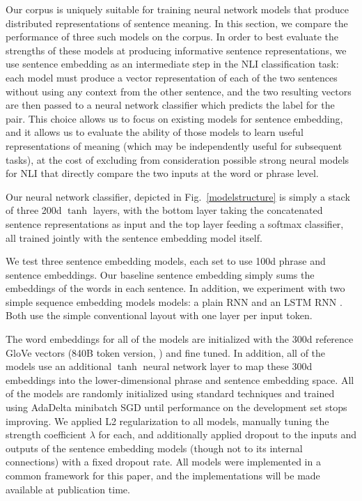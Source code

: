 Our corpus is uniquely suitable for training neural network models that produce distributed representations of sentence meaning. In this section, we compare the performance of three such models on the corpus. 
In order to best evaluate the strengths of these models at producing informative sentence representations, we use sentence embedding as an intermediate step in the NLI classification task: each model must produce a vector representation of each of the two sentences without using any context from the other sentence, and the two resulting vectors are then passed to a neural network classifier which predicts the label for the pair. This choice allows us to focus on existing models for sentence embedding, and it allows us to evaluate the ability of those models to learn useful representations of meaning (which may be independently useful for subsequent tasks), at the cost of excluding from consideration possible strong neural models for NLI that directly compare the two inputs at the word or phrase level.



Our neural network classifier, depicted in Fig.~\ref{modelstructure} is simply a stack of three 200d $\tanh$ layers, with the bottom layer taking the concatenated sentence representations as input and the top layer feeding a softmax classifier, all trained jointly with the sentence embedding model itself.

We test three sentence embedding models, each set to use 100d phrase and sentence embeddings. Our baseline sentence embedding simply sums the embeddings of the words in each sentence. In addition, we experiment with two simple sequence embedding models models: a plain RNN and an LSTM RNN \cite{hochreiter1997long}. Both use the simple conventional layout with one layer per input token.

The word embeddings for all of the models are initialized with the 300d reference GloVe vectors (840B token version, \citealt{pennington2014glove}) and fine tuned. In addition, all of the models use an additional $\tanh$ neural network layer to map these 300d embeddings into the lower-dimensional phrase and sentence embedding space. All of the models are randomly initialized using standard techniques and trained using AdaDelta \cite{zeiler2012adadelta} minibatch SGD until performance on the development set stops improving. We applied L2 regularization to all models, manually tuning the strength coefficient $\lambda$ for each, and additionally applied dropout \cite{srivastava2014dropout} to the inputs and outputs of the sentence embedding models (though not to its internal connections) with a fixed dropout rate. All models were implemented in a common framework for this paper, and the implementations will be made available at publication time.

